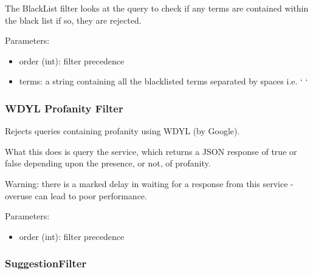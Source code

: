 \documentclass[letterpaper,10pt,english]{sphinxmanual}
\begin{document}
\begin{fulllineitems}
\label{api2.0:puppy.query.filter.BlackListFilter}
The BlackList filter looks at the query to check if any terms are contained within the black list if so, they are rejected.

Parameters:
\begin{itemize}
\item {} 
order (int): filter precedence

\item {} 
terms: a string containing all the blacklisted terms separated by spaces i.e. ` `

\end{itemize}

\end{fulllineitems}



\subsubsection{WDYL Profanity Filter}
\label{api2.0:wdyl-profanity-filter}

\begin{fulllineitems}
\label{api2.0:puppy.query.filter.WdylProfanityQueryFilter}
Rejects queries containing profanity using WDYL (by Google).

What this does is query the service, which returns a JSON response of true or false depending upon the presence, or not, of profanity.

Warning: there is a marked delay in waiting for a response from this service - overuse can lead to poor performance.

Parameters:
\begin{itemize}
\item {} 
order (int): filter precedence

\end{itemize}

\end{fulllineitems}



\subsubsection{SuggestionFilter}
\label{api2.0:suggestionfilter}
\end{document}
